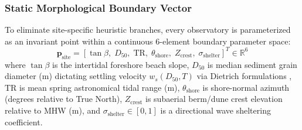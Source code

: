 \documentclass[journal]{IEEEtran}
\begin{document}
\subsubsection{Static Morphological Boundary Vector}
To eliminate site-specific heuristic branches, every observatory is parameterized as an invariant point within a continuous 6-element boundary parameter space:
\begin{equation}
\mathbf{p}_{\text{site}} = \left[\tan\beta,\; D_{50},\; \text{TR},\; \theta_{\text{shore}},\; Z_{\text{crest}},\; \sigma_{\text{shelter}}\right]^T \in \mathbb{R}^6
\label{eq:psite}
\end{equation}
where $\tan\beta$ is the intertidal foreshore beach slope, $D_{50}$ is median sediment grain diameter ($\text{m}$) dictating settling velocity $w_s(D_{50}, T)$ via Dietrich formulations \cite{dietrich1982settling}, $\text{TR}$ is mean spring astronomical tidal range ($\text{m}$), $\theta_{\text{shore}}$ is shore-normal azimuth (degrees relative to True North), $Z_{\text{crest}}$ is subaerial berm/dune crest elevation relative to MHW ($\text{m}$), and $\sigma_{\text{shelter}} \in [0, 1]$ is a directional wave sheltering coefficient.
\end{document}
